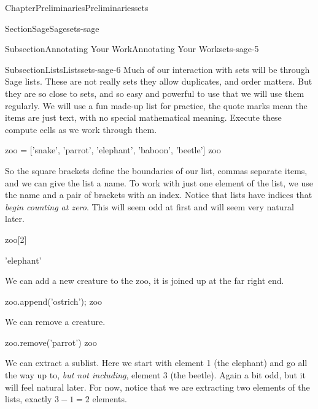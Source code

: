 \documentclass[oneside,10pt,]{book}
\numberwithin{equation}{section}
\begin{document}
\begin{chapterptx}{Chapter}{Preliminaries}{}{Preliminaries}{}{}{sets}
\begin{sectionptx}{Section}{Sage}{}{Sage}{}{}{sets-sage}
\begin{subsectionptx}{Subsection}{Annotating Your Work}{}{Annotating Your Work}{}{}{sets-sage-5}
\end{subsectionptx}
%
%
\typeout{************************************************}
\typeout{************************************************}
%
\begin{subsectionptx}{Subsection}{Lists}{}{Lists}{}{}{sets-sage-6}
Much of our interaction with sets will be through Sage lists.  These are not really sets \textemdash{} they allow duplicates, and order matters.  But they are so close to sets, and so easy and powerful to use that we will use them regularly.  We will use a fun made-up list for practice, the quote marks mean the items are just text, with no special mathematical meaning.  Execute these compute cells as we work through them.%
\begin{sageinput}
zoo = ['snake', 'parrot', 'elephant', 'baboon', 'beetle']
zoo
\end{sageinput}
\begin{sageoutput}
\end{sageoutput}
So the square brackets define the boundaries of our list, commas separate items, and we can give the list a name.  To work with just one element of the list, we use the name and a pair of brackets with an index.  Notice that lists have indices that \emph{begin counting at zero}.  This will seem odd at first and will seem very natural later.%
\begin{sageinput}
zoo[2]
\end{sageinput}
\begin{sageoutput}
'elephant'
\end{sageoutput}
We can add a new creature to the zoo, it is joined up at the far right end.%
\begin{sageinput}
zoo.append('ostrich'); zoo
\end{sageinput}
\begin{sageoutput}
\end{sageoutput}
We can remove a creature.%
\begin{sageinput}
zoo.remove('parrot')
zoo
\end{sageinput}
\begin{sageoutput}
\end{sageoutput}
We can extract a sublist.  Here we start with element 1 (the elephant) and go all the way up to, \emph{but not including}, element 3 (the beetle).  Again a bit odd, but it will feel natural later.  For now, notice that we are extracting two elements of the lists, exactly \(3-1=2\) elements.%

\end{subsectionptx}
\end{sectionptx}
\end{chapterptx}
\end{document}

